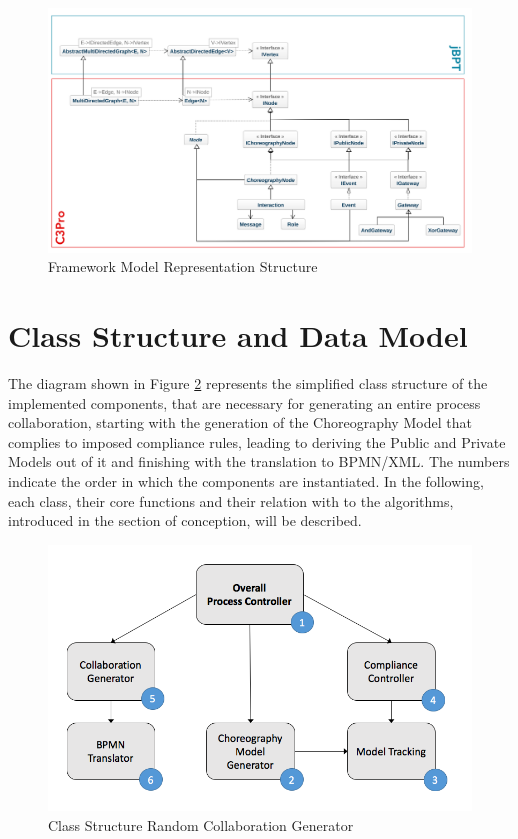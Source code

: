 \begin{figure}[H]
\includegraphics[width=1\textwidth]{src/images/c3pro_graph_structure.png}
\caption{Framework Model Representation Structure}
\label{fig:choreo_structure}
\end{figure}

\section{Class Structure and Data Model}

The diagram shown in Figure \ref{fig:impl_class_overview} represents the simplified class structure of the implemented components, that are necessary for generating an entire process collaboration, starting with the generation of the Choreography Model that complies to imposed compliance rules, leading to deriving the Public and Private Models out of it and finishing with the translation to BPMN/XML. The numbers indicate the order in which the components are instantiated. In the following, each class, their core functions and their relation with to the algorithms, introduced in the section of conception, will be described.

\begin{figure}[H]
\includegraphics[width=1\textwidth]{src/images/impl_architecture.png}
\caption{Class Structure Random Collaboration Generator}
\label{fig:impl_class_overview}
\end{figure}

